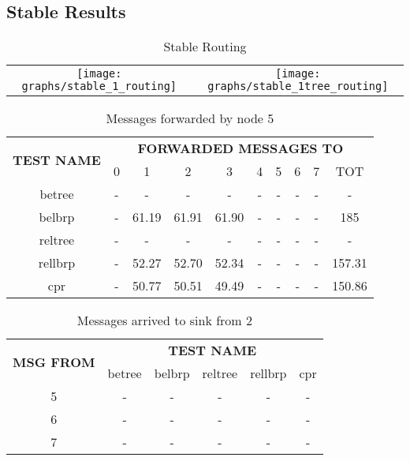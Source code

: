\documentclass{article}
\begin{document}
	\subsection{Stable Results}
		\begin{table}[H]
			\centering
			\begin{tabular}{cc}
				\texttt{[image: graphs/stable\_1\_routing]}&\texttt{[image: graphs/stable\_1tree\_routing]}\\
			\end{tabular}
			\caption{Stable Routing}
			\label{tab:comparisonStable}
		\end{table}
		
		\begin{table}[H]
			\begin{center}
			    \begin{tabular}{|c|c|c|c|c|c|c|c|c|c|}
				    \hline
				    \multirow{2}{*}{\textbf{TEST NAME}} & \multicolumn{9}{c|}{\textbf{FORWARDED MESSAGES TO}} \\ \cline{2-10}
					& 0 & 1 & 2 & 3 & 4 & 5 & 6 & 7 & TOT \\ \hline
				    betree & - & - & - & - & - & - & - & - & - \\ \hline
				    belbrp & - & 61.19 & 61.91 & 61.90 & - & - & - & - & 185 \\ \hline
				    reltree & - & - & - & - & - & - & - & - & - \\ \hline
   				    rellbrp & - & 52.27 & 52.70 & 52.34 & - & - & - & - & 157.31 \\ \hline
				    cpr & - & 50.77 & 50.51 & 49.49 & - & - & - & - & 150.86 \\ \hline
			    \end{tabular}
			\end{center}	
			\caption{Messages forwarded by node 5}
			\label{tab:stableF5}
		\end{table}
		
		\begin{table}[H]
			\begin{center}
			    \begin{tabular}{|c|c|c|c|c|c|}
				    \hline
				    \multirow{2}{*}{\textbf{MSG FROM}} & \multicolumn{5}{c|}{\textbf{TEST NAME}} \\ \cline{2-6}
					& betree & belbrp & reltree & rellbrp & cpr \\ \hline
					5 & - & - & - & - & - \\ \hline
					6 & - & - & - & - & - \\ \hline
					7 & - & - & - & - & - \\ \hline
			    \end{tabular}
			\end{center}	
			\caption{Messages arrived to sink from 2}
			\label{tab:stableArrivals}
		\end{table}
		
\end{document}
